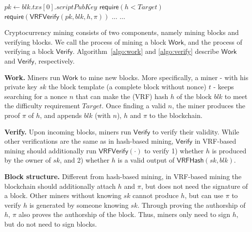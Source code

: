 \documentclass[sigconf]{acmart}
\begin{document}
\begin{algorithm}[h]
\caption{$\mathsf{Verify}(blk, h, \pi, Target)$}
\label{algo:verify}
\SetAlgoLined\DontPrintSemicolon
$pk \gets blk . txs[0] . scriptPubKey$ 
$\mathsf{require}(h < Target)$ 
$\mathsf{require}(\mathsf{VRFVerify}(pk, blk, h, \pi))$ \;
$\dots$ 
$\dots$ 
\end{algorithm}

Cryptocurrency mining consists of two components, namely mining blocks and verifying blocks.
We call the process of mining a block $\mathsf{Work}$, and the process of verifying a block $\mathsf{Verify}$.
Algorithm~\ref{algo:work} and \ref{algo:verify} describe $\mathsf{Work}$ and $\mathsf{Verify}$, respectively.

\textbf{Work.}
Miners run $\mathsf{Work}$ to mine new blocks.
More specifically, a miner - with his private key $sk$ the block template (a complete block without nonce) $t$ - keeps searching for a nonce $n$ that can make the (VRF) hash $h$ of the block $blk$ to meet the difficulty requirement $Target$.
Once finding a valid $n$, the miner produces the proof $\pi$ of $h$, and appends $blk$ (with $n$), $h$ and $\pi$ to the blockchain.

\textbf{Verify.}
Upon incoming blocks, miners run $\mathsf{Verify}$ to verify their validity.
While other verifications are the same as in hash-based mining, $\mathsf{Verify}$ in VRF-based mining should additionally run $\mathsf{VRFVerify}(\cdot)$ to verify 1) whether $h$ is produced by the owner of $sk$, and 2) whether $h$ is a valid output of $\mathsf{VRFHash}(sk, blk)$.

\textbf{Block structure.}
Different from hash-based mining, in VRF-based mining the blockchain should additionally attach $h$ and $\pi$, but does not need the signature of a block.
Other miners without knowing $sk$ cannot produce $h$, but can use $\pi$ to verify $h$ is generated by someone knowing $sk$.
Through proving the authorship of $h$, $\pi$ also proves the authorship of the block.
Thus, miners only need to sign $h$, but do not need to sign blocks.
\end{document}
